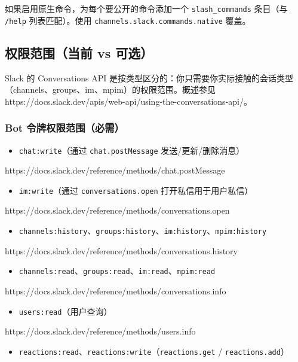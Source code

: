 如果启用原生命令，为每个要公开的命令添加一个 \texttt{slash\_commands} 条目（与 \texttt{/help} 列表匹配）。使用 \texttt{channels.slack.commands.native} 覆盖。

\subsection{权限范围（当前 vs 可选）}


Slack 的 Conversations API 是按类型区分的：你只需要你实际接触的会话类型（channels、groups、im、mpim）的权限范围。概述参见 https://docs.slack.dev/apis/web-api/using-the-conversations-api/。

\subsubsection{Bot 令牌权限范围（必需）}


\begin{itemize}
  \item \texttt{chat:write}（通过 \texttt{chat.postMessage} 发送/更新/删除消息）
\end{itemize}

https://docs.slack.dev/reference/methods/chat.postMessage
\begin{itemize}
  \item \texttt{im:write}（通过 \texttt{conversations.open} 打开私信用于用户私信）
\end{itemize}

https://docs.slack.dev/reference/methods/conversations.open
\begin{itemize}
  \item \texttt{channels:history}、\texttt{groups:history}、\texttt{im:history}、\texttt{mpim:history}
\end{itemize}

https://docs.slack.dev/reference/methods/conversations.history
\begin{itemize}
  \item \texttt{channels:read}、\texttt{groups:read}、\texttt{im:read}、\texttt{mpim:read}
\end{itemize}

https://docs.slack.dev/reference/methods/conversations.info
\begin{itemize}
  \item \texttt{users:read}（用户查询）
\end{itemize}

https://docs.slack.dev/reference/methods/users.info
\begin{itemize}
  \item \texttt{reactions:read}、\texttt{reactions:write}（\texttt{reactions.get} / \texttt{reactions.add}）
\end{itemize}


